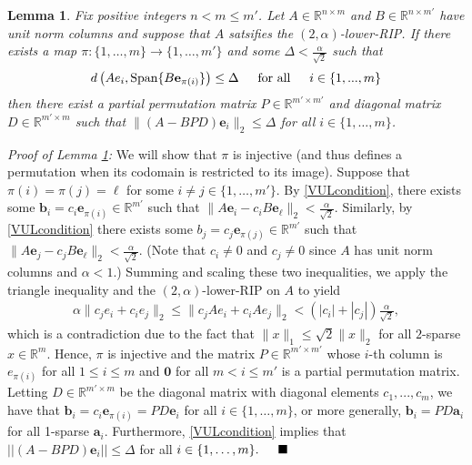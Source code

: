 \documentclass[journal,onecolumn]{IEEEtran}
\newtheorem{lemma}{Lemma}
\begin{document}

\begin{lemma}\label{VectorUniquenessLemma}
Fix positive integers $n < m \leq m'$. Let $A\in \mathbb{R}^{n \times m}$ and $B \in \mathbb{R}^{n \times m'}$ have unit norm columns and suppose that $A$ satsifies the $(2,\alpha)$-lower-RIP. If there exists a map $\pi: \{1, \ldots, m\} \to \{1, \ldots, m'\}$ and some $\Delta < \frac{\alpha}{\sqrt{2}}$ such that 
\begin{align}\label{VULcondition}
d\left( Ae_i, \text{Span}\{B\mathbf{e}_{\pi(i)}\} \right) \leq \Delta \indent \text{for all} \indent i \in \{1, ..., m \}
\end{align}
%
then there exist a partial permutation matrix $P \in \mathbb{R}^{m' \times m'}$ and diagonal matrix $D \in \mathbb{R}^{m' \times m}$ such that $\|(A - BPD)\mathbf{e}_i\|_2 \leq \Delta$ for all $i \in \{1, \ldots, m\}$.
\end{lemma}

\emph{Proof of Lemma \ref{VectorUniquenessLemma}:}
We will show that $\pi$ is injective (and thus defines a permutation when its codomain is restricted to its image). Suppose that $\pi(i) = \pi(j) = \ell$ for some $i \neq j \in \{1, \ldots, m'\}$. By \eqref{VULcondition}, there exists some $\mathbf{b}_i = c_i \mathbf{e}_{\pi(i)} \in \mathbb{R}^{m'}$ such that $\|A\mathbf{e}_i - c_iB\mathbf{e}_{\ell}\|_2 < \frac{\alpha}{\sqrt{2}}$. Similarly, by \eqref{VULcondition} there exists some $b_j = c_j \mathbf{e}_{\pi(j)} \in \mathbb{R}^{m'}$ such that $\|A\mathbf{e}_j - c_jB\mathbf{e}_{\ell}\|_2 < \frac{\alpha}{\sqrt{2}}$. (Note that $c_i \neq 0$ and $c_j \neq 0$ since $A$ has unit norm columns and $\alpha < 1$.) Summing and scaling these two inequalities, we apply the triangle inequality and the $(2,\alpha)$-lower-RIP on $A$ to yield
\begin{align}
\alpha\|c_je_i + c_ie_j\|_2 \leq \|c_jAe_i + c_iAe_j\|_2 < (|c_i| + |c_j|)\frac{\alpha}{\sqrt{2}},
\end{align}
%
which is a contradiction due to the fact that $\|x\|_1 \leq \sqrt{2}\|x\|_2$ for all $2$-sparse $x \in \mathbb{R}^m$. Hence, $\pi$ is injective and the matrix $P \in \mathbb{R}^{m' \times m'}$ whose $i$-th column is $e_{\pi(i)}$ for all $1 \leq i \leq m$ and $\mathbf{0}$ for all $m < i \leq m'$ is a partial permutation matrix. Letting $D \in \mathbb{R}^{m' \times m}$ be the diagonal matrix with diagonal elements $c_1, ..., c_m$, we have that $\mathbf{b}_i = c_i\mathbf{e}_{\pi(i)} = PD\mathbf{e}_i$ for all $i \in \{1, \ldots, m\}$, or more generally, $\mathbf{b}_i = PD\mathbf{a}_i$ for all 1-sparse $\mathbf{a}_i$. Furthermore, \eqref{VULcondition} implies that $||(A - BPD)\mathbf{e}_i|| \leq \Delta$ for all $i \in \{1, \ldots, m\}. \indent \blacksquare$
\end{document}
